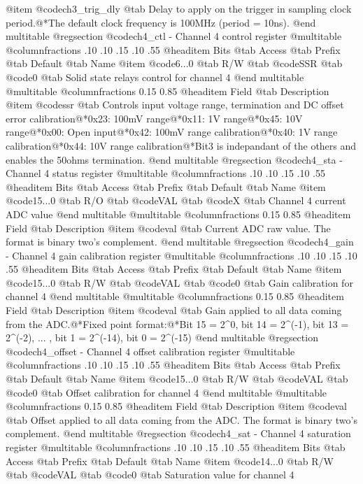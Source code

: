 @item @code{ch3_trig_dly} @tab Delay to apply on the trigger in sampling clock period.@*The default clock frequency is 100MHz (period = 10ns).
@end multitable
@regsection @code{ch4_ctl} - Channel 4 control register
@multitable @columnfractions .10 .10 .15 .10 .55
@headitem Bits @tab Access @tab Prefix @tab Default @tab Name
@item @code{6...0}
@tab R/W @tab
@code{SSR}
@tab @code{0} @tab 
Solid state relays control for channel 4
@end multitable
@multitable @columnfractions 0.15 0.85
@headitem Field @tab Description
@item @code{ssr} @tab Controls input voltage range, termination and DC offset error calibration@*0x23: 100mV range@*0x11: 1V range@*0x45: 10V range@*0x00: Open input@*0x42: 100mV range calibration@*0x40: 1V range calibration@*0x44: 10V range calibration@*Bit3 is indepandant of the others and enables the 50ohms termination.
@end multitable
@regsection @code{ch4_sta} - Channel 4 status register
@multitable @columnfractions .10 .10 .15 .10 .55
@headitem Bits @tab Access @tab Prefix @tab Default @tab Name
@item @code{15...0}
@tab R/O @tab
@code{VAL}
@tab @code{X} @tab 
Channel 4 current ADC value
@end multitable
@multitable @columnfractions 0.15 0.85
@headitem Field @tab Description
@item @code{val} @tab Current ADC raw value. The format is binary two's complement.
@end multitable
@regsection @code{ch4_gain} - Channel 4 gain calibration register
@multitable @columnfractions .10 .10 .15 .10 .55
@headitem Bits @tab Access @tab Prefix @tab Default @tab Name
@item @code{15...0}
@tab R/W @tab
@code{VAL}
@tab @code{0} @tab 
Gain calibration for channel 4
@end multitable
@multitable @columnfractions 0.15 0.85
@headitem Field @tab Description
@item @code{val} @tab Gain applied to all data coming from the ADC.@*Fixed point format:@*Bit 15 = 2^0, bit 14 = 2^(-1), bit 13 = 2^(-2), ... , bit 1 = 2^(-14), bit 0 = 2^(-15)
@end multitable
@regsection @code{ch4_offset} - Channel 4 offset calibration register
@multitable @columnfractions .10 .10 .15 .10 .55
@headitem Bits @tab Access @tab Prefix @tab Default @tab Name
@item @code{15...0}
@tab R/W @tab
@code{VAL}
@tab @code{0} @tab 
Offset calibration for channel 4
@end multitable
@multitable @columnfractions 0.15 0.85
@headitem Field @tab Description
@item @code{val} @tab Offset applied to all data coming from the ADC. The format is binary two's complement.
@end multitable
@regsection @code{ch4_sat} - Channel 4 saturation register
@multitable @columnfractions .10 .10 .15 .10 .55
@headitem Bits @tab Access @tab Prefix @tab Default @tab Name
@item @code{14...0}
@tab R/W @tab
@code{VAL}
@tab @code{0} @tab 
Saturation value for channel 4
